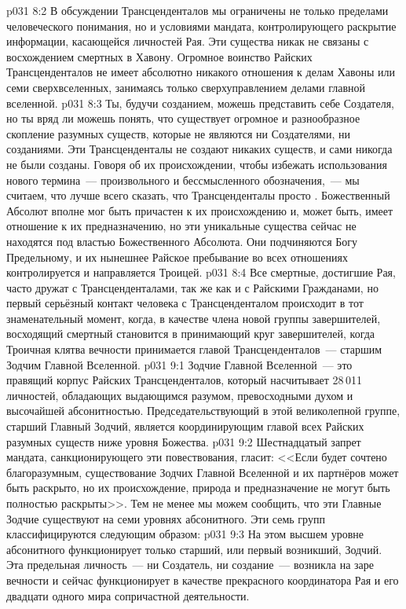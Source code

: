 \vs p031 8:2 В обсуждении Трансценденталов мы ограничены не только пределами человеческого понимания, но и условиями мандата, контролирующего раскрытие информации, касающейся личностей Рая. Эти существа никак не связаны с восхождением смертных в Хавону. Огромное воинство Райских Трансценденталов не имеет абсолютно никакого отношения к делам Хавоны или семи сверхвселенных, занимаясь только сверхуправлением делами главной вселенной.
\vs p031 8:3 Ты, будучи созданием, можешь представить себе Создателя, но ты вряд ли можешь понять, что существует огромное и разнообразное скопление разумных существ, которые не являются ни Создателями, ни созданиями. Эти Трансценденталы не создают никаких существ, и сами никогда не были созданы. Говоря об их происхождении, чтобы избежать использования нового термина~--- произвольного и бессмысленного обозначения,~--- мы считаем, что лучше всего сказать, что Трансценденталы просто . Божественный Абсолют вполне мог быть причастен к их происхождению и, может быть, имеет отношение к их предназначению, но эти уникальные существа сейчас не находятся под властью Божественного Абсолюта. Они подчиняются Богу Предельному, и их нынешнее Райское пребывание во всех отношениях контролируется и направляется Троицей.
\vs p031 8:4 Все смертные, достигшие Рая, часто дружат с Трансценденталами, так же как и с Райскими Гражданами, но первый серьёзный контакт человека с Трансценденталом происходит в тот знаменательный момент, когда, в качестве члена новой группы завершителей, восходящий смертный становится в принимающий круг завершителей, когда Троичная клятва вечности принимается главой Трансценденталов~--- старшим Зодчим Главной Вселенной.
\vs p031 9:1 Зодчие Главной Вселенной~--- это правящий корпус Райских Трансценденталов, который насчитывает 28\,011 личностей, обладающих выдающимся разумом, превосходными духом и высочайшей абсонитностью. Председательствующий в этой великолепной группе, старший Главный Зодчий, является координирующим главой всех Райских разумных существ ниже уровня Божества.
\vs p031 9:2 Шестнадцатый запрет мандата, санкционирующего эти повествования, гласит: <<Если будет сочтено благоразумным, существование Зодчих Главной Вселенной и их партнёров может быть раскрыто, но их происхождение, природа и предназначение не могут быть полностью раскрыты>>. Тем не менее мы можем сообщить, что эти Главные Зодчие существуют на семи уровнях абсонитного. Эти семь групп классифицируются следующим образом:
\vs p031 9:3  На этом высшем уровне абсонитного функционирует только старший, или первый возникший, Зодчий. Эта предельная личность~--- ни Создатель, ни создание~--- возникла на заре вечности и сейчас функционирует в качестве прекрасного координатора Рая и его двадцати одного мира сопричастной деятельности.
